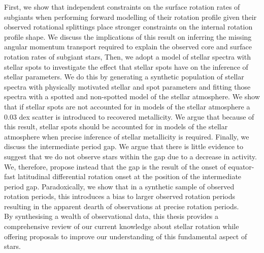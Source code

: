 {First, we show that independent constraints on the surface rotation rates of subgiants when performing forward modelling of their rotation profile given their observed rotational splittings place stronger constraints on the internal rotation profile shape. We discuss the implications of this result on inferring the missing angular momentum transport required to explain the observed core and surface rotation rates of subgiant stars,
Then, we adopt a model of stellar spectra with stellar spots to investigate the effect that stellar spots have on the inference of stellar parameters. We do this by generating a synthetic population of stellar spectra with physically motivated stellar and spot parameters and fitting those spectra with a spotted and non-spotted model of the stellar atmosphere. We show that if stellar spots are not accounted for in models of the stellar atmosphere a 0.03 dex scatter is introduced to recovered metallicity. We argue that because of this result, stellar spots should be accounted for in models of the stellar atmosphere when precise inference of stellar metallicity is required.
Finally, we discuss the intermediate period gap. We argue that there is little evidence to suggest that we do not observe stars within the gap due to a decrease in activity. We, therefore, propose instead that the gap is the result of the onset of equator-fast latitudinal differential rotation onset at the position of the intermediate period gap. Paradoxically, we show that in a synthetic sample of observed rotation periods, this introduces a bias to larger observed rotation periods resulting in the apparent dearth of observations at precise rotation periods.\\

By synthesising a wealth of observational data, this thesis provides a comprehensive review of our current knowledge about stellar rotation while offering proposals to improve our understanding of this fundamental aspect of stars.
}


